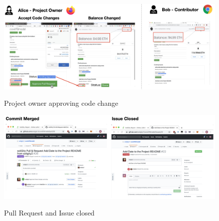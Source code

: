 \documentclass[12pt]{article}
\renewcommand{\_}{\kern-1.5pt\textunderscore\kern-1.5pt}
\begin{document}
\begin{figure}[H]
	\centering
	\includegraphics[width=16cm]{graphs/55. reward_2.png}\\
	\caption{Project owner approving code change}
	\label{fig:reward2}
\end{figure}

\begin{figure}[H]
	\centering
	\includegraphics[width=16cm]{graphs/56. reward_3.png}\\
	\caption{Pull Request and Issue closed}
	\label{fig:reward3}
\end{figure}


\end{document}
